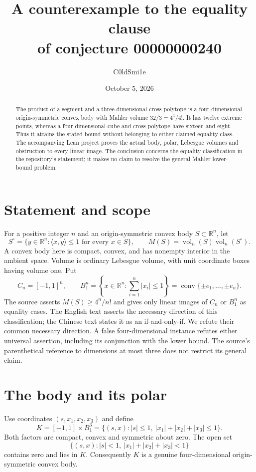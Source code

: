 \documentclass[11pt]{article}
\title{A counterexample to the equality clause\protect\\of conjecture 00000000240}
\author{C0ldSmi1e}
\date{October 5, 2026}
\newcommand{\R}{\mathbb R}
\newcommand{\vol}{\operatorname{vol}}
\newcommand{\conv}{\operatorname{conv}}
\begin{document}
\maketitle

\begin{abstract}
The product of a segment and a three-dimensional cross-polytope is a
four-dimensional origin-symmetric convex body with Mahler volume $32/3=4^4/4!$.
It has twelve extreme points, whereas a four-dimensional cube and
cross-polytope have sixteen and eight. Thus it attains the stated bound
without belonging to either claimed equality class. The accompanying Lean
project proves the actual body, polar, Lebesgue volumes and obstruction to
every linear image. The conclusion concerns the equality classification in
the repository's statement; it makes no claim to resolve the general
Mahler lower-bound problem.
\end{abstract}

\section{Statement and scope}
For a positive integer $n$ and an origin-symmetric convex body $S\subset\R^n$, let
\[
 S^\circ=\{y\in\R^n:\langle x,y\rangle\leq1\text{ for every }x\in S\},
 \qquad M(S)=\vol_n(S)\vol_n(S^\circ).
\]
A convex body here is compact, convex, and has nonempty interior in the
ambient space. Volume is ordinary Lebesgue volume, with unit coordinate
boxes having volume one. Put
\[
 C_n=[-1,1]^n,\qquad
 B_1^n=\left\{x\in\R^n:\sum_{i=1}^n|x_i|\leq1\right\}
       =\conv\{\pm e_1,\ldots,\pm e_n\}.
\]
The source asserts $M(S)\geq4^n/n!$ and gives only linear images of $C_n$
or $B_1^n$ as equality cases. The English text asserts the necessary
direction of this classification; the Chinese text states it as an
if-and-only-if. We refute their common necessary direction. A false
four-dimensional instance refutes either universal assertion, including its
conjunction with the lower bound. The source's parenthetical reference to
dimensions at most three does not restrict its general claim.

\section{The body and its polar}
Use coordinates $(s,x_1,x_2,x_3)$ and define
\[
 K=[-1,1]\times B_1^3
   =\{(s,x): |s|\leq1,\ |x_1|+|x_2|+|x_3|\leq1\}.
\]
Both factors are compact, convex and symmetric about zero. The open set
\[
 \{(s,x):|s|<1,\ |x_1|+|x_2|+|x_3|<1\}
\]
contains zero and lies in $K$. Consequently $K$ is a genuine
four-dimensional origin-symmetric convex body.
\end{document}
